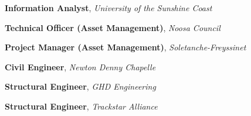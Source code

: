%
%
%


\begin{scholarship}

					{\textbf{Information Analyst}, \textit{University of the Sunshine Coast}}

					{\textbf{Technical Officer (Asset Management)}, \textit{Noosa Council}}
					
					{\textbf{Project Manager (Asset Management)}, \textit{Soletanche-Freyssinet}}

					{\textbf{Civil Engineer}, \textit{Newton Denny Chapelle}}
					
					{\textbf{Structural Engineer}, \textit{GHD Engineering}}	
					
					{\textbf{Structural Engineer}, \textit{Trackstar Alliance}}			
\end{scholarship}